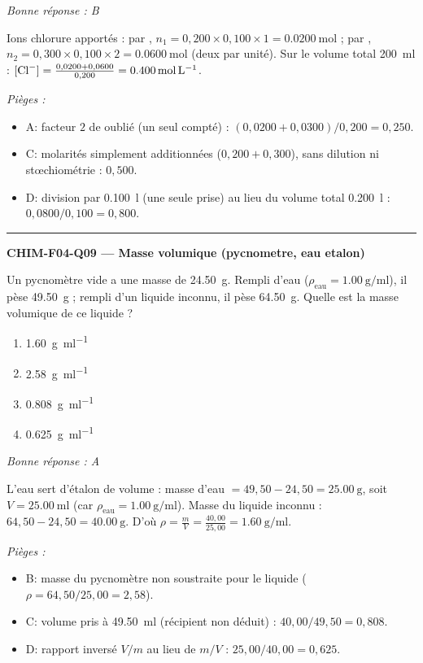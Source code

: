 \documentclass[11pt,a4paper]{article}
\begin{document}
\textit{Bonne réponse : B}\par
Ions chlorure apportés : par , $n_1 = 0{,}200\times 0{,}100\times 1 = \qty{0.0200}{\mole}$ ; par , $n_2 = 0{,}300\times 0{,}100\times 2 = \qty{0.0600}{\mole}$ (deux  par unité). Sur le volume total \qty{200}{\milli\litre} : $[\ce{Cl-}] = \frac{0{,}0200 + 0{,}0600}{0{,}200} = \qty{0.400}{\mole\per\litre}$.\par
\textit{Pièges :}
\begin{itemize}
\item A: facteur $2$ de  oublié (un seul  compté) : $(0{,}0200+0{,}0300)/0{,}200 = 0{,}250$.
\item C: molarités simplement additionnées ($0{,}200 + 0{,}300$), sans dilution ni stœchiométrie : $0{,}500$.
\item D: division par \qty{0.100}{\litre} (une seule prise) au lieu du volume total \qty{0.200}{\litre} : $0{,}0800/0{,}100 = 0{,}800$.
\end{itemize}
\vspace{8pt}\hrule\vspace{8pt}
\noindent\textbf{CHIM-F04-Q09 --- Masse volumique (pycnometre, eau etalon)}\par
Un pycnomètre vide a une masse de \qty{24.50}{\gram}. Rempli d'eau ($\rho_{\text{eau}} = \qty{1.00}{\gram\per\milli\litre}$), il pèse \qty{49.50}{\gram} ; rempli d'un liquide inconnu, il pèse \qty{64.50}{\gram}. Quelle est la masse volumique de ce liquide ?
\begin{enumerate}[label=\Alph*)]
\item \qty{1.60}{\gram\per\milli\litre}
\item \qty{2.58}{\gram\per\milli\litre}
\item \qty{0.808}{\gram\per\milli\litre}
\item \qty{0.625}{\gram\per\milli\litre}
\end{enumerate}
\textit{Bonne réponse : A}\par
L'eau sert d'étalon de volume : masse d'eau $= 49{,}50 - 24{,}50 = \qty{25.00}{\gram}$, soit $V = \qty{25.00}{\milli\litre}$ (car $\rho_{\text{eau}} = \qty{1.00}{\gram\per\milli\litre}$). Masse du liquide inconnu : $64{,}50 - 24{,}50 = \qty{40.00}{\gram}$. D'où $\rho = \frac{m}{V} = \frac{40{,}00}{25{,}00} = \qty{1.60}{\gram\per\milli\litre}$.\par
\textit{Pièges :}
\begin{itemize}
\item B: masse du pycnomètre non soustraite pour le liquide ($\rho = 64{,}50/25{,}00 = 2{,}58$).
\item C: volume pris à \qty{49.50}{\milli\litre} (récipient non déduit) : $40{,}00/49{,}50 = 0{,}808$.
\item D: rapport inversé $V/m$ au lieu de $m/V$ : $25{,}00/40{,}00 = 0{,}625$.
\end{itemize}
\end{document}
